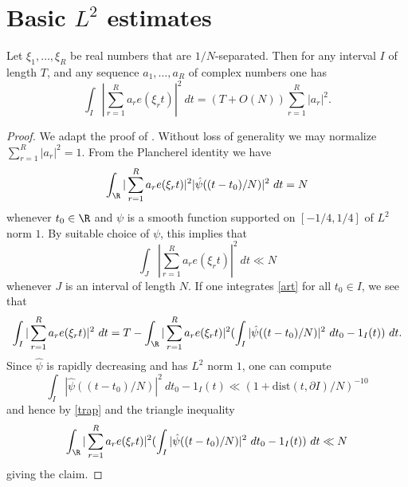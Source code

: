 \chapter{Basic \texorpdfstring{$L^2$}{L2} estimates}

\begin{lemma}\label{l2-int}  Let $\xi_1,\dots,\xi_R$ be real numbers that are $1/N$-separated.  Then for any interval $I$ of length $T$, and any sequence $a_1,\dots,a_R$ of complex numbers one has
$$ \int_I |\sum_{r=1}^R a_r e(\xi_r t)|^2\ dt = (T + O(N)) \sum_{r=1}^R |a_r|^2.$$
\end{lemma}

\begin{proof} We adapt the proof of \cite[Theorem 9.1]{ik}.  Without loss of generality we may normalize
    $\sum_{r=1}^R |a_r|^2=1$.    From the Plancherel identity we have
\begin{equation}\label{art}
 \int_\R |\sum_{r=1}^R a_r e(\xi_r t)|^2 |\hat \psi((t-t_0)/N)|^2\ dt = N
 \end{equation}
whenever $t_0 \in \R$ and $\psi$ is a smooth function supported on $[-1/4, 1/4]$ of $L^2$ norm $1$.   By suitable choice of $\psi$, this implies that
\begin{equation}\label{trap}
 \int_J |\sum_{r=1}^R a_r e(\xi_r t)|^2\ dt \ll N
\end{equation}
whenever $J$ is an interval of length $N$.  If one integrates \eqref{art} for all $t_0 \in I$, we see that
$$ \int_I |\sum_{r=1}^R a_r e(\xi_r t)|^2\ dt = T - \int_\R |\sum_{r=1}^R a_r e(\xi_r t)|^2 (\int_I |\hat \psi((t-t_0)/N)|^2\ dt_0 - 1_I(t))\ dt.$$
Since $\hat \psi$ is rapidly decreasing and has $L^2$ norm $1$, one can compute
$$ \int_I |\hat \psi((t-t_0)/N)|^2\ dt_0 - 1_I(t) \ll (1 + \mathrm{dist}(t, \partial I) / N)^{-10}$$
and hence by \eqref{trap} and the triangle inequality
$$ \int_\R |\sum_{r=1}^R a_r e(\xi_r t)|^2 (\int_I |\hat \psi((t-t_0)/N)|^2\ dt_0 - 1_I(t))\ dt \ll N$$
giving the claim.
\end{proof}


